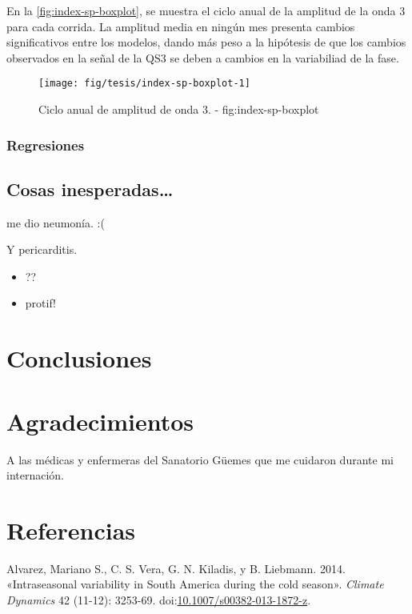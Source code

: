 \documentclass[spanish,a4paper,12p]{book}
\providecommand{\tightlist}{%
  \setlength{\itemsep}{0pt}\setlength{\parskip}{0pt}}
\begin{document}
En la \autoref{fig:index-sp-boxplot}, se muestra el ciclo anual de la
amplitud de la onda 3 para cada corrida. La amplitud media en ningún mes
presenta cambios significativos entre los modelos, dando más peso a la
hipótesis de que los cambios observados en la señal de la QS3 se deben a
cambios en la variabiliad de la fase.

\begin{figure*}
\texttt{[image: fig/tesis/index-sp-boxplot-1]} \caption{Ciclo anual de amplitud de onda 3. - fig:index-sp-boxplot}\label{fig:index-sp-boxplot}
\end{figure*}

\subsection{Regresiones}\label{regresiones-1}


\section{Cosas inesperadas\ldots{}}\label{cosas-inesperadas}

me dio neumonía. :(

Y pericarditis.

\begin{itemize}
\tightlist
\item
  ??
\item
  protif!
\end{itemize}

\chapter{Conclusiones}\label{conclusiones}

\chapter{Agradecimientos}\label{agradecimientos}

A las médicas y enfermeras del Sanatorio Güemes que me cuidaron durante
mi internación.

\chapter*{Referencias}\label{referencias}

\hypertarget{refs}{}
\hypertarget{ref-Alvarez2014}{}
Alvarez, Mariano S., C. S. Vera, G. N. Kiladis, y B. Liebmann. 2014.
«Intraseasonal variability in South America during the cold season».
\emph{Climate Dynamics} 42 (11-12): 3253-69.
doi:\href{https://doi.org/10.1007/s00382-013-1872-z}{10.1007/s00382-013-1872-z}.
\end{document}

